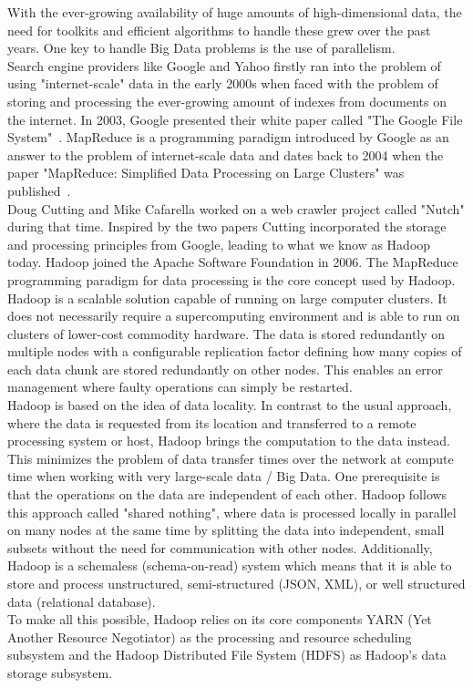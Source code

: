 With the ever-growing availability of huge amounts of high-dimensional data, the need for toolkits and efficient algorithms to handle these grew over the past years. One key to handle Big Data problems is the use of parallelism.\\
Search engine providers like Google and Yahoo firstly ran into the problem of using "internet-scale" data in the early 2000s when faced with the problem of storing and processing the ever-growing amount of indexes from documents on the internet. In 2003, Google presented their white paper called "The Google File System"~\cite{gfs}. MapReduce is a programming paradigm introduced by Google as an answer to the problem of internet-scale data and dates back to 2004 when the paper "MapReduce: Simplified Data Processing on Large Clusters" was published~\cite{mapreduce1}.\\ 
Doug Cutting and Mike Cafarella worked on a web crawler project called "Nutch" during that time. Inspired by the two papers Cutting incorporated the storage and processing principles from Google, leading to what we know as Hadoop today. Hadoop joined the Apache Software Foundation in 2006. The MapReduce programming paradigm for data processing is the core concept used by Hadoop.~\cite[p. 6]{sparkbook1}\\ 
Hadoop is a scalable solution capable of running on large computer clusters. It does not necessarily require a supercomputing environment and is able to run on clusters of lower-cost commodity hardware. The data is stored redundantly on multiple nodes with a configurable replication factor defining how many copies of each data chunk are stored redundantly on other nodes. This enables an error management where faulty operations can simply be restarted.\\
Hadoop is based on the idea of data locality. In contrast to the usual approach, where the data is requested from its location and transferred to a remote processing system or host, Hadoop brings the computation to the data instead. This minimizes the problem of data transfer times over the network at compute time when working with very large-scale data / Big Data. One prerequisite is that the operations on the data are independent of each other. Hadoop follows this approach called "shared nothing", where data is processed locally in parallel on many nodes at the same time by splitting the data into independent, small subsets without the need for communication with other nodes. Additionally, Hadoop is a schemaless (schema-on-read) system which means that it is able to store and process unstructured, semi-structured (JSON, XML), or well structured data (relational database).~\cite[p. 7]{sparkbook1}\\
To make all this possible, Hadoop relies on its core components YARN (Yet Another Resource Negotiator) as the processing and resource scheduling subsystem and the Hadoop Distributed File System (HDFS) as Hadoop's data storage subsystem.\\

